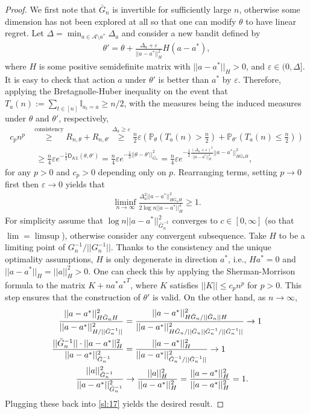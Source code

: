 \documentclass[letterpaper,11pt,openright,openany]{book}
\numberwithin{equation}{section}
\theoremstyle{plain}
\theoremstyle{definition}
\def\P{{\mathbb P}}
\def\e{{\varepsilon}}
\def\t{{\theta}}
\begin{document}
\begin{proof}
We first note that $\bar{G}_n$ is invertible for sufficiently large $n$, otherwise some dimension has not been explored at all so that one can modify $\t$ to have linear regret. Let $\Delta = \min_{a\in\mathcal A\setminus a^*}\Delta_a$ and consider a new bandit defined by 
\begin{align*}
\t' = \t + \frac{\Delta_a + \e}{||a-a^*||^2_H}H(a-a^*),
\end{align*}
where $H$ is some positive semidefinite matrix with $||a-a^*||_H>0$, and $\e\in (0, \Delta]$. It is easy to check that action $a$ under $\t'$ is better than $a^*$ by $\e$. Therefore, applying the Bretagnolle-Huber inequality on the event that $T_a(n):=\sum_{t\in [n]}\mathbb I_{a_t = a}\geq n/2$, with the measures being the induced measures under $\t$ and $\t'$, respectively, 
\begin{align*}
c_p n^p&\stackrel{\text{consistency}}{\geq} R_{n, \t}+R_{n, \t'}\stackrel{\Delta_a\geq\e}{\geq}\frac{n}{2}\e\left(\P_\t\left(T_a(n)>\frac{n}{2}\right)+\P_{\t'}\left(T_a(n)\leq\frac{n}{2}\right)\right)\\
&\ \ \geq \frac{n}{4}\e e^{-\frac{1}{2}\mathsf D_{KL}(\t, \t')} =  \frac{n}{4}\e e^{-\frac{1}{2}||\t-\t'||^2_{\bar{G}_n}}=\frac{n}{4}\e e^{-\frac{1}{2}\frac{(\Delta_a+\e)^2}{||a-a^*||_H^4}||a-a^*||^2_{H\bar{G}_nH}},
\end{align*}
for any $p>0$ and $c_p>0$ depending only on $p$. 
Rearranging terms, setting $p\to 0$ first then $\e\to 0$ yields that
\begin{align}
\liminf_{n\to\infty}\frac{\Delta_a^2 ||a-a^*||^2_{H\bar{G}_nH}}{2\log n||a-a^*||_H^4}\geq 1. \label{sl:17}
\end{align}
For simplicity assume that $\log n ||a-a^*||_{\bar{G}_n^{-1}}^2$ converges to $c\in [0, \infty]$ (so that $\lim =\limsup$), otherwise consider any convergent subsequence.  Take $H$ to be a limiting point of $G_n^{-1}/||G^{-1}_n||$. Thanks to the consistency and the unique optimality assumptions, $H$ is only degenerate in direction $a^*$, i.e., $Ha^*=0$ and $||a-a^*||_H = ||a||^2_H>0$.  One can check this by applying the Sherman-Morrison formula to the matrix $K+n a^*{a^*}^T$, where $K$ satisfies $||K||\leq c_pn^p$ for $p>0$. This step ensures that the construction of $\t'$ is valid. On the other hand, as $n\to\infty$,
\begin{align*}
\frac{||a-a^*||^2_{H\bar{G}_nH}}{||a-a^*||^2_{H/||\bar{G}^{-1}_n||}} & = \frac{||a-a^*||^2_{\textcolor{black}{H\bar{G}_n/||\bar{G}_n||}H}}{||a-a^*||^2_{\textcolor{black}{H\bar{G}_n/||\bar{G}_n||}\bar{G}^{-1}_n/||\bar{G}^{-1}_n||}}\to 1\\
\frac{||\bar{G}^{-1}_n||\cdot ||a-a^*||^2_{H}}{||a-a^*||^2_{\bar{G}^{-1}_n}} &= \frac{||a-a^*||^2_{H}}{||a-a^*||^2_{\bar{G}^{-1}_n/||\bar{G}^{-1}_n||}}\to 1\\
\frac{||a||^2_{\bar{G}_n^{-1}}}{||a-a^*||^2_{\bar{G}_n^{-1}}}&\to\frac{||a||^2_{H}}{||a-a^*||^2_{H}} = \frac{||a-a^*||^2_{H}}{||a-a^*||^2_{H}}=1.
\end{align*}
Plugging these back into \eqref{sl:17} yields the desired result. 
\end{proof}
\end{document}

